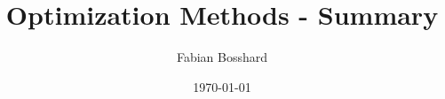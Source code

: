 \newcommand{\im}{\operatorname{Im}}

\newcommand{\matr}[1]{\underline{\boldsymbol{#1}}}
\newcommand{\vect}[1]{\vec{\boldsymbol{#1}}}




\newcommand{\dif}{\mathrm{d}}

\newcommand{\R}{\mathbb{R}}
\newcommand{\N}{\mathbb{N}}
\newcommand{\Z}{\mathbb{Z}}
\newcommand{\Q}{\mathbb{Q}}
\newcommand{\C}{\mathbb{C}}

\newcommand{\Var}{\operatorname{Var}}
\newcommand{\Cov}{\operatorname{Cov}}
\newcommand{\Exp}{\operatorname{E}}
\newcommand{\Prob}{\operatorname{P}}
\newcommand{\numof}{\ensuremath{\# \,}} %
\newcommand{\blackheight}{\operatorname{bh}}

\algnewcommand{\TO}{, \ldots ,}
\algnewcommand{\DOWNTO}{, \ldots ,}
\algnewcommand{\OR}{\vee}
\algnewcommand{\AND}{\wedge}
\algnewcommand{\NOT}{\neg}
\algnewcommand{\append}{\circ}


\newcommand{\attrib}[2]{\ensuremath{#1\mathtt{.}\mathtt{#2}}} %
\newcommand{\attribnormal}[2]{\ensuremath{#1\mathtt{.}#2}} 





\title{Optimization Methods - Summary}
\author{Fabian Bosshard}
\date{\today}



\usepackage[
  pdfauthor={Fabian Bosshard},
  pdftitle={USI - Optimization Methods - Course Summary},
  pdfkeywords={USI, optimization methods, course summary, informatics},
  colorlinks=false,        %
  pdfborder={0 0 0}        %
]{hyperref}
\usepackage[
  type     = {CC},
  modifier = {by},
  version  = {4.0},
]{doclicense}
\usepackage{cleveref}





